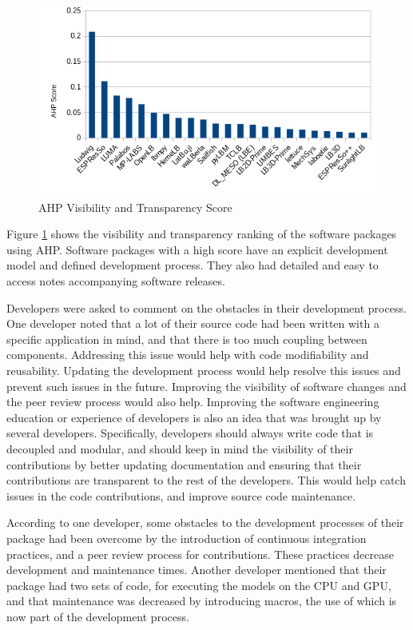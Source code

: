 \documentclass[12pt, notitlepage]{article}
\begin{document}
\begin{figure}[h!]
	\begin{center}
		\includegraphics[width=1.0\textwidth]{visibilitytransparency_chart}
		\caption{AHP Visibility and Transparency Score}
		\label{Fig_VisibilityTransparency}
	\end{center}
\end{figure}

Figure \ref{Fig_VisibilityTransparency} shows the visibility and transparency ranking of the software packages using AHP. Software packages with a high score have an explicit development model and defined development process. They also 
had detailed and easy to access notes accompanying software releases. 

Developers were asked to comment on the obstacles in their development process. One developer noted that a lot of their source code had been written with a specific application in mind, and that there is too much coupling between components. Addressing this issue would help with code modifiability and reusability. Updating the development process would help resolve this issues and prevent such issues in the future. Improving the visibility of software changes and the peer review process would also help. Improving the software engineering education or experience of developers is also an idea that was brought up by several developers. Specifically, developers should always write code that is decoupled and modular, and should keep in mind the visibility of their contributions by better updating documentation and ensuring that their contributions are transparent to the rest of the developers. This would help catch issues in the code contributions, and improve source code maintenance.   

According to one developer, some obstacles to the development processes of their package had been overcome by the introduction of continuous integration practices, and a peer review process for contributions. These practices decrease development and maintenance times. Another developer mentioned that their package had two sets of code, for executing the models on the CPU and GPU, and that maintenance was decreased by introducing macros, the use of which is now part of the development process. 
\end{document}

